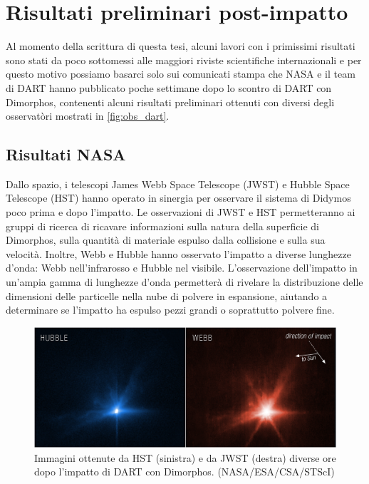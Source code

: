 \chapter{Risultati preliminari post-impatto}\label{ch:ch_5}
Al momento della scrittura di questa tesi, alcuni lavori con i primissimi risultati sono stati da poco sottomessi alle maggiori riviste scientifiche internazionali e per questo motivo possiamo basarci solo sui comunicati stampa che NASA e il team di DART hanno pubblicato poche settimane dopo lo scontro di DART con Dimorphos, contenenti alcuni risultati preliminari ottenuti con diversi degli osservatòri mostrati in \cref{fig:obs_dart}. 

\section{Risultati NASA}
Dallo spazio, i telescopi James Webb Space Telescope (JWST) e Hubble Space Telescope (HST) hanno operato in sinergia per osservare il sistema di Didymos poco prima e dopo l'impatto. Le osservazioni di JWST e HST permetteranno ai gruppi di ricerca di ricavare informazioni sulla natura della superficie di Dimorphos, sulla quantità di materiale espulso dalla collisione e sulla sua velocità. Inoltre, Webb e Hubble hanno osservato l'impatto a diverse lunghezze d'onda: Webb nell'infrarosso e Hubble nel visibile. L'osservazione dell'impatto in un'ampia gamma di lunghezze d'onda permetterà di rivelare la distribuzione delle dimensioni delle particelle nella nube di polvere in espansione, aiutando a determinare se l'impatto ha espulso pezzi grandi o soprattutto polvere fine. 

\begin{figure}[!h]
    \centering
    \includegraphics[width=\textwidth]{figure/jwst_hst_impact.png}
    \caption[Immagini ottenute da Hubble e da Webb diverse ore dopo l'impatto di DART con Dimorphos.]{Immagini ottenute da HST (sinistra) e da JWST (destra) diverse ore dopo l'impatto di DART con Dimorphos. (NASA/ESA/CSA/STScI)}
    \label{fig:jwst_hst_impact}
\end{figure}

